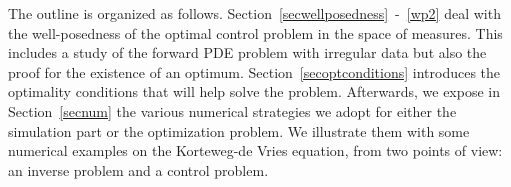 The outline is organized as follows. Section~\ref{secwellposedness}~-~\ref{wp2} deal with the well-posedness of the optimal control problem in the space of measures. This includes a study of the forward PDE problem with irregular data but also the proof for the existence of an optimum. Section~\ref{secoptconditions} introduces the optimality conditions that will help solve the problem. Afterwards, we expose in Section~\ref{secnum} the various numerical strategies we adopt for either the simulation part or the optimization problem. We illustrate them with some numerical examples on the Korteweg-de Vries equation, from two points of view: an inverse problem and a control problem.

